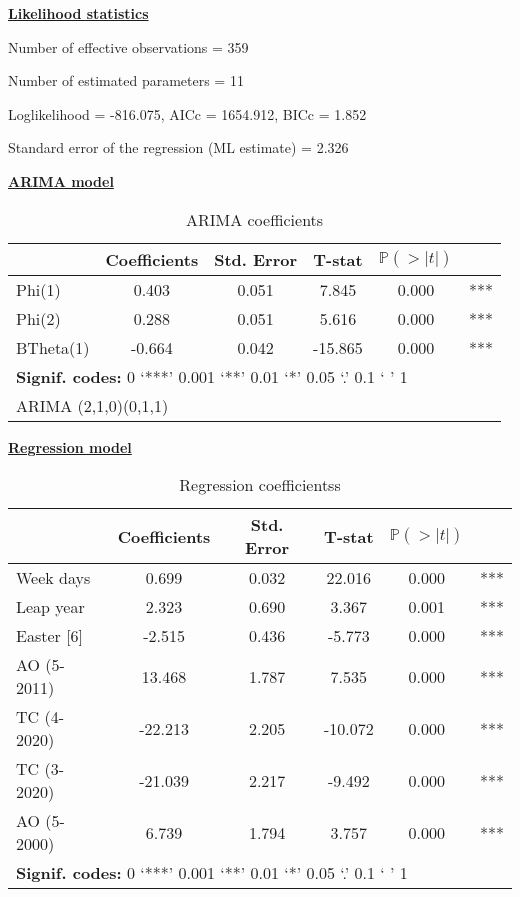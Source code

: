 \documentclass[
]{article}
\begin{document}
\underline{\textbf{Likelihood statistics}}

Number of effective observations = 359

Number of estimated parameters = 11

Loglikelihood = -816.075, AICc = 1654.912, BICc = 1.852

Standard error of the regression (ML estimate) = 2.326

\underline{\textbf{ARIMA model}}

\begin{table}[H]
\centering
\caption{\label{tab:unnamed-chunk-4}ARIMA coefficients}
\centering
\begin{tabular}[t]{lccccc}
\toprule
  & Coefficients & Std. Error & T-stat & $\mathbb P (> \lvert t \rvert)$ & \\
\midrule
Phi(1) & 0.403 & 0.051 & 7.845 & 0.000 & ***\\
Phi(2) & 0.288 & 0.051 & 5.616 & 0.000 & ***\\
BTheta(1) & -0.664 & 0.042 & -15.865 & 0.000 & ***\\
\bottomrule
\multicolumn{6}{l}{\rule{0pt}{1em}\textbf{Signif. codes: }0 `***' 0.001 `**' 0.01 `*' 0.05 `.' 0.1 ` ' 1}\\
\multicolumn{6}{l}{\rule{0pt}{1em}ARIMA (2,1,0)(0,1,1)}\\
\end{tabular}
\end{table}

\underline{\textbf{Regression model}}

\begin{table}[H]
\centering
\caption{\label{tab:unnamed-chunk-4}Regression coefficientss}
\centering
\begin{tabular}[t]{lccccc}
\toprule
  & Coefficients & Std. Error & T-stat & $\mathbb P (> \lvert t \rvert)$ & \\
\midrule
Week days & 0.699 & 0.032 & 22.016 & 0.000 & ***\\
Leap year & 2.323 & 0.690 & 3.367 & 0.001 & ***\\
Easter [6] & -2.515 & 0.436 & -5.773 & 0.000 & ***\\
AO (5-2011) & 13.468 & 1.787 & 7.535 & 0.000 & ***\\
TC (4-2020) & -22.213 & 2.205 & -10.072 & 0.000 & ***\\
\addlinespace
TC (3-2020) & -21.039 & 2.217 & -9.492 & 0.000 & ***\\
AO (5-2000) & 6.739 & 1.794 & 3.757 & 0.000 & ***\\
\bottomrule
\multicolumn{6}{l}{\rule{0pt}{1em}\textbf{Signif. codes: }0 `***' 0.001 `**' 0.01 `*' 0.05 `.' 0.1 ` ' 1}\\
\end{tabular}
\end{table}
\end{document}
